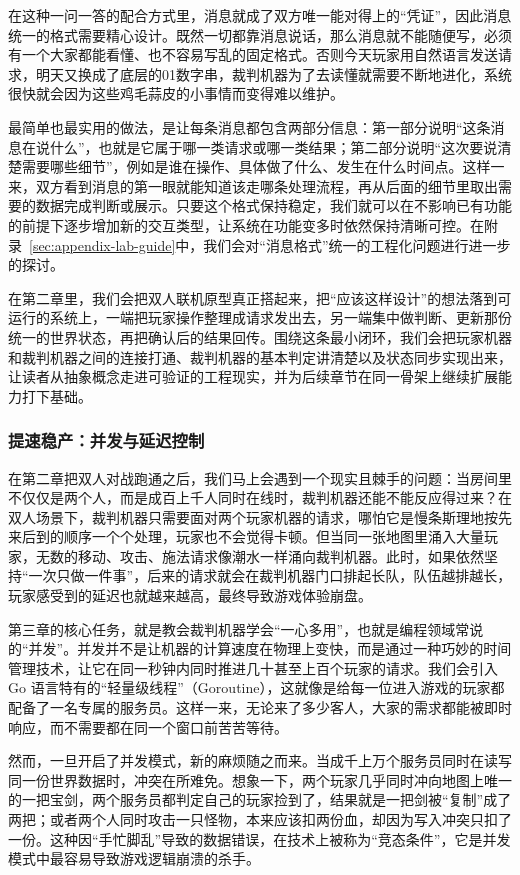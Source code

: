 在这种一问一答的配合方式里，消息就成了双方唯一能对得上的“凭证”，因此消息统一的格式需要精心设计。既然一切都靠消息说话，那么消息就不能随便写，必须有一个大家都能看懂、也不容易写乱的固定格式。否则今天玩家用自然语言发送请求，明天又换成了底层的01数字串，裁判机器为了去读懂就需要不断地进化，系统很快就会因为这些鸡毛蒜皮的小事情而变得难以维护。

最简单也最实用的做法，是让每条消息都包含两部分信息：第一部分说明“这条消息在说什么”，也就是它属于哪一类请求或哪一类结果；第二部分说明“这次要说清楚需要哪些细节”，例如是谁在操作、具体做了什么、发生在什么时间点。这样一来，双方看到消息的第一眼就能知道该走哪条处理流程，再从后面的细节里取出需要的数据完成判断或展示。只要这个格式保持稳定，我们就可以在不影响已有功能的前提下逐步增加新的交互类型，让系统在功能变多时依然保持清晰可控。在附录~\ref{sec:appendix-lab-guide}中，我们会对“消息格式”统一的工程化问题进行进一步的探讨。

在第二章里，我们会把双人联机原型真正搭起来，把“应该这样设计”的想法落到可运行的系统上，一端把玩家操作整理成请求发出去，另一端集中做判断、更新那份统一的世界状态，再把确认后的结果回传。围绕这条最小闭环，我们会把玩家机器和裁判机器之间的连接打通、裁判机器的基本判定讲清楚以及状态同步实现出来，让读者从抽象概念走进可验证的工程现实，并为后续章节在同一骨架上继续扩展能力打下基础。

\subsubsection{提速稳产：并发与延迟控制}\label{sec:并发与延迟控制}
在第二章把双人对战跑通之后，我们马上会遇到一个现实且棘手的问题：当房间里不仅仅是两个人，而是成百上千人同时在线时，裁判机器还能不能反应得过来？在双人场景下，裁判机器只需要面对两个玩家机器的请求，哪怕它是慢条斯理地按先来后到的顺序一个个处理，玩家也不会觉得卡顿。但当同一张地图里涌入大量玩家，无数的移动、攻击、施法请求像潮水一样涌向裁判机器。此时，如果依然坚持“一次只做一件事”，后来的请求就会在裁判机器门口排起长队，队伍越排越长，玩家感受到的延迟也就越来越高，最终导致游戏体验崩盘。

第三章的核心任务，就是教会裁判机器学会“一心多用”，也就是编程领域常说的“并发”。并发并不是让机器的计算速度在物理上变快，而是通过一种巧妙的时间管理技术，让它在同一秒钟内同时推进几十甚至上百个玩家的请求。我们会引入 Go 语言特有的“轻量级线程”（Goroutine），这就像是给每一位进入游戏的玩家都配备了一名专属的服务员。这样一来，无论来了多少客人，大家的需求都能被即时响应，而不需要都在同一个窗口前苦苦等待。

然而，一旦开启了并发模式，新的麻烦随之而来。当成千上万个服务员同时在读写同一份世界数据时，冲突在所难免。想象一下，两个玩家几乎同时冲向地图上唯一的一把宝剑，两个服务员都判定自己的玩家捡到了，结果就是一把剑被“复制”成了两把；或者两个人同时攻击一只怪物，本来应该扣两份血，却因为写入冲突只扣了一份。这种因“手忙脚乱”导致的数据错误，在技术上被称为“竞态条件”，它是并发模式中最容易导致游戏逻辑崩溃的杀手。

